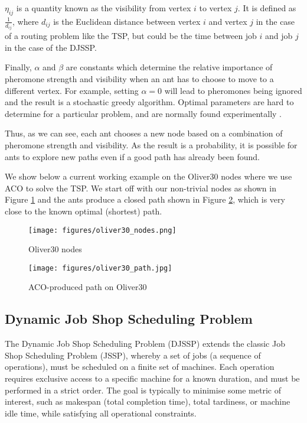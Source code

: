 \documentclass[project-plan]{report-template}
\begin{document}
$\eta_{ij}$ is a quantity known as the visibility from vertex $i$ to vertex $j$. It is defined as $\frac{1}{d_{ij}}$, where $d_{ij}$ is the Euclidean distance between vertex $i$ and vertex $j$ in the case of a routing problem like the TSP, but could be the time between job $i$ and job $j$ in the case of the DJSSP. 

Finally, $\alpha$ and $\beta$ are constants which determine the relative importance of pheromone strength and visibility when an ant has to choose to move to a different vertex. For example, setting $\alpha = 0$ will lead to pheromones being ignored and the result is a stochastic greedy algorithm. Optimal parameters are hard to determine for a particular problem, and are normally found experimentally \cite{ant_parameters}.

Thus, as we can see, each ant chooses a new node based on a combination of pheromone strength and visibility. As the result is a probability, it is possible for ants to explore new paths even if a good path has already been found. 

We show below a current working example on the Oliver30 nodes \cite{oliver30} where we use ACO to solve the TSP. We start off with our non-trivial nodes as shown in Figure \ref{fig:oliver30-nodes} and the ants produce a closed path shown in Figure \ref{fig:oliver30-path}, which is very close to the known optimal (shortest) path.


\begin{figure}[H]
    \centering
    \texttt{[image: figures/oliver30\_nodes.png]}
    \caption{Oliver30 nodes}
    \label{fig:oliver30-nodes}
\end{figure}

\begin{figure}[H]
    \centering
    \texttt{[image: figures/oliver30\_path.jpg]}
    \caption{ACO-produced path on Oliver30}
    \label{fig:oliver30-path}
\end{figure}


\subsection{Dynamic Job Shop Scheduling Problem}

The Dynamic Job Shop Scheduling Problem (DJSSP) extends the classic Job Shop Scheduling Problem (JSSP), whereby a set of jobs (a sequence of operations), must be scheduled on a finite set of machines. Each operation requires exclusive access to a specific machine for a known duration, and must be performed in a strict order. The goal is typically to minimise some metric of interest, such as makespan (total completion time), total tardiness, or machine idle time, while satisfying all operational constraints.
\end{document}
